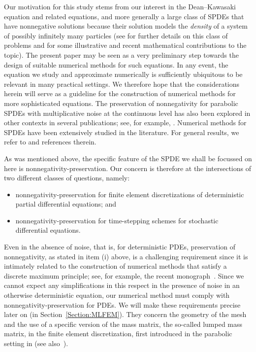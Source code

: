 \documentclass[12pt]{article}
\begin{document}
Our motivation for this study stems from our interest in the Dean--Kawasaki equation and related equations, and more generally a large class of SPDEs that have nonnegative solutions because their solution models the \emph{density} of a system of possibly infinitely many particles (see \cite{djurdjevac2024weak, cornalba2023dean, martinez2024finite, magaletti2022positivity} for further details on this class of problems and for some illustrative and recent mathematical contributions to the topic). The present paper may be seen as a very preliminary step towards the design of suitable numerical methods for such equations. In any event, the equation we study and approximate numerically is sufficiently ubiquitous to be relevant in many practical settings. We therefore hope that the considerations herein will serve as a guideline for the construction of numerical methods for more sophisticated equations. 
The preservation of nonnegativity for parabolic SPDEs with multiplicative noise at the continuous level has also been explored in other contexts in several publications; see, for example, 
\cite{benth1997positivity,chen2019comparison,cresson2013positivity,Moreno}. Numerical methods for SPDEs have been extensively studied in the literature. For general results, we refer to \cite{MR3154916,lord2014introduction,walsh2005finite} and references therein. 
 
As was mentioned above, the specific feature of the SPDE we shall be focussed on here is nonnegativity-preservation. Our concern is therefore at the intersections of two different classes of questions, namely:
\begin{itemize}
\item[(i)] nonnegativity-preservation for finite element discretizations of deterministic partial differential equations; and
\item[(ii)] nonnegativity-preservation for time-stepping schemes for stochastic differential equations.
\end{itemize}
Even in the absence of noise, that is, for deterministic PDEs, preservation of nonnegativity, as stated in item (i) above, is a challenging requirement since it is intimately related to the construction of numerical methods that satisfy a discrete maximum principle;  see, for example, the recent monograph~\cite{MR4900691}. Since we cannot expect any simplifications in this respect in the presence of noise in an otherwise deterministic equation, our numerical method must comply with nonnegativity-preservation for PDEs. We will make these requirements precise later on (in Section~\ref{Section:MLFEM}). They concern the geometry of the mesh and the use of a specific version of the mass matrix, the so-called lumped mass matrix, in the finite element discretization, first introduced in the parabolic setting in \cite{fujii1973some} (see also~\cite{thomee2015positivity,chatzipantelidis2015preservation}).
\end{document}
